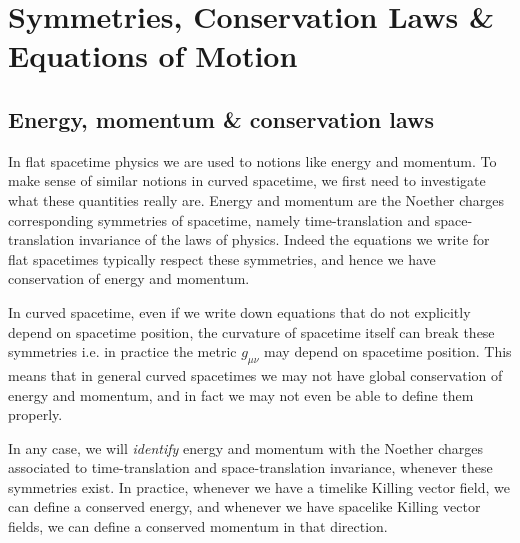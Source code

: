 \documentclass[../geometry_main.tex]{subfiles}
\begin{document}
\chapter{Symmetries, Conservation Laws \& Equations of Motion}


\section{Energy, momentum \& conservation laws}



\begin{mytheorem}
In flat spacetime physics we are used to notions like energy and momentum.
To make sense of similar notions in curved spacetime, we first need to investigate what these quantities really are.
Energy and momentum are the Noether charges corresponding symmetries of spacetime, namely time-translation and space-translation invariance of the laws of physics.
Indeed the equations we write for flat spacetimes  typically respect these symmetries, and hence we have conservation of energy and momentum.

In curved spacetime, even if we write down equations that do not explicitly depend on spacetime position, the curvature of spacetime itself can break these symmetries i.e. in practice the metric $g_{\mu\nu}$ may depend on spacetime position.
This means that in general curved spacetimes we may not have global conservation of energy and momentum, and in fact we may not even be able to define them properly.

In any case, we will \emph{identify} energy and momentum with the Noether charges associated to time-translation and space-translation invariance, whenever these symmetries exist.
In practice, whenever we have a timelike Killing vector field, we can define a conserved energy, and whenever we have spacelike Killing vector fields, we can define a conserved momentum in that direction.
\end{mytheorem}
\end{document}
